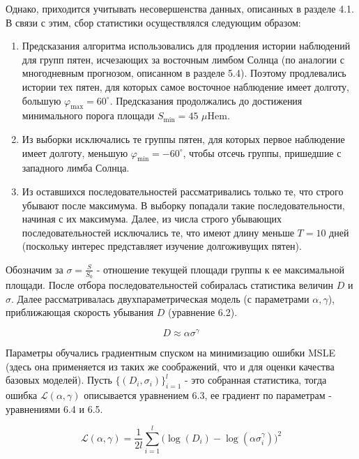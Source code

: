 \documentclass[a4paper, 12pt]{article}
\begin{document}
Однако, приходится учитывать несовершенства данных, описанных в разделе 4.1. В связи с этим, сбор статистики осуществлялся следующим образом:

\begin{enumerate}
    \item Предсказания алгоритма использовались для продления истории наблюдений для групп пятен, исчезающих за восточным лимбом Солнца (по аналогии с многодневным прогнозом, описанном в разделе 5.4). Поэтому продлевались истории тех пятен, для которых самое восточное наблюдение имеет долготу, большую $\varphi_{\max} = 60^{\circ}$. Предсказания продолжались до достижения минимального порога площади $S_{\min} = 45$ $\mu$Hem.
    \item Из выборки исключались те группы пятен, для которых первое наблюдение имеет долготу, меньшую $\varphi_{\min} = -60^{\circ}$, чтобы отсечь группы, пришедшие с западного лимба Солнца.
    \item Из оставшихся последовательностей рассматривались только те, что строго убывают после максимума. В выборку попадали такие последовательности, начиная с их максимума. Далее, из числа строго убывающих последовательностей исключались те, что имеют длину меньше $T=10$ дней (поскольку интерес представляет изучение долгоживущих пятен).
\end{enumerate}

Обозначим за $\sigma = \frac{S}{S_0}$ - отношение текущей площади группы к ее максимальной площади. После отбора последовательностей собиралась статистика величин $D$ и $\sigma$. Далее рассматривалась двухпараметрическая модель (с параметрами $\alpha, \gamma$), приближающая скорость убывания $D$ (уравнение 6.2).

\begin{equation}
    D \approx \alpha \sigma^{\gamma}
\end{equation}

Параметры обучались градиентным спуском на минимизацию ошибки MSLE (здесь она применяется из таких же соображений, что и для оценки качества базовых моделей). Пусть $\{(D_i, \sigma_i)\}_{i=1}^l$ - это собранная статистика, тогда ошибка $\mathcal{L}(\alpha, \gamma)$ описывается уравнением 6.3, ее градиент по параметрам - уравнениями 6.4 и 6.5.

\begin{equation}
    \mathcal{L}(\alpha, \gamma) = \frac{1}{2l} \sum_{i=1}^l \Big(\log(D_i) - \log(\alpha \sigma_i^{\gamma})\Big)^2
\end{equation}
\end{document}
